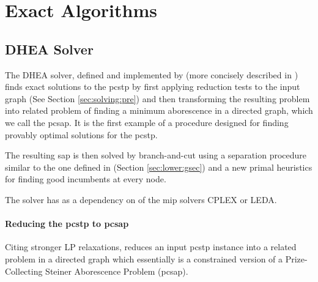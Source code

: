\clearpage
\section{Exact Algorithms}\label{sec:solving:exact}

\subsection{DHEA Solver}
\label{sec:exact:dhea}
The DHEA solver, defined and implemented
by \citet{ljubic2005solving}
(more concisely described in \citet{ljubic2006algorithmic}) finds exact solutions to the \gls{pcstp}
by first applying
reduction tests to the input graph (See Section \ref{sec:solving:pre}) and
then transforming the resulting problem into related problem of finding a minimum
aborescence in a directed graph, which we call the \gls{pcsap}.
It is the first example of a procedure designed for
finding provably optimal solutions for the \gls{pcstp}.

The resulting \gls{sap} is then solved by branch-and-cut using a separation procedure
similar to the one defined in \citet{lucena2004strong}
(Section \ref{sec:lower:gsec}) and a new primal heuristics for
finding good incumbents at every node.

The solver has as a dependency on of the \gls{mip} solvers CPLEX or LEDA.
 \paragraph{Reducing the \gls{pcstp} to \gls{pcsap}}
 Citing stronger LP relaxations, \citet{ljubic2005solving} reduces an input \gls{pcstp} instance
 into a related problem in a directed graph which essentially is a constrained version
 of a Prize-Collecting Steiner Aborescence Problem (\gls{pcsap}).

